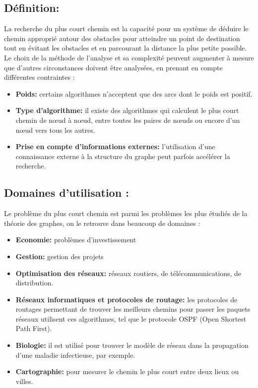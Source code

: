 \subsection{Définition:}
La recherche du plus court chemin est la capacité pour un système de déduire le chemin approprié autour des obstacles pour atteindre un point de destination tout en évitant les obstacles et en parcourant la distance la plus petite possible.
Le choix de la méthode de l'analyse et sa complexité peuvent augmenter à mesure que d'autres circonstances doivent être analysées, en prenant en compte différentes contraintes :

\begin{itemize}
	\item \textbf{Poids:} certains algorithmes n'acceptent que des arcs dont le poids est positif.
	\item \textbf{Type d'algorithme:} il existe des algorithmes qui calculent le plus court chemin de nœud à nœud, entre toutes les paires de nœuds ou encore d'un nœud vers tous les autres.
	\item \textbf{Prise en compte d'informations externes:} l'utilisation d'une connaissance externe à la structure du graphe peut parfois accélérer la recherche.
\end{itemize}

\subsection{Domaines d'utilisation :}
Le problème du plus court chemin est parmi les problèmes les plus étudiés de la théorie des graphes, on le retrouve dans beaucoup de domaines :
\begin{itemize}
\item\textbf{Economie:} problèmes d’investissement
\item\textbf{Gestion:} gestion des projets
\item\textbf{Optimisation des réseaux:} réseaux routiers, de télécommunications, de distribution.
\item\textbf{Réseaux informatiques et protocoles de routage:} les protocoles de routages permettant de trouver les meilleurs chemins pour passer les paquets réseaux utilisent ces algorithmes, tel que le protocole OSPF (Open Shortest Path First).
\item\textbf{Biologie:} il est utilisé pour trouver le modèle de réseau dans la propagation d'une maladie infectieuse, par exemple.
\item\textbf{Cartographie:} pour mesurer le chemin le plus court entre deux lieux ou villes.
\end{itemize}

